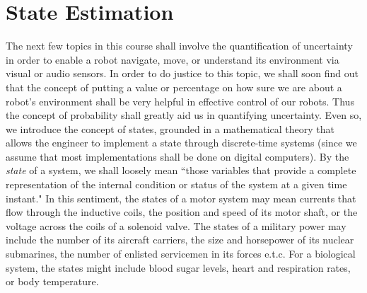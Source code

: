\chapter{State Estimation}
\label{chap:state_ext}

The next few topics in this course shall involve the quantification of uncertainty in order to enable a robot navigate, move, or understand its environment via visual or audio sensors. In order to do justice to this topic, we shall soon find out that the concept of putting a value or percentage on how sure we are about a robot's environment shall be very helpful in effective control of our robots. Thus the concept of probability shall greatly aid us in quantifying uncertainty. Even so, we introduce the concept of states, grounded in a mathematical theory that allows the engineer to implement a state through discrete-time systems (since we assume that most implementations shall be done on digital computers). By the \textit{state} of a system, we shall loosely mean ``those variables that provide a complete representation of the internal condition or status of the system at a given time instant." In this sentiment, the states of a motor system may mean currents that flow through the inductive coils, the position and speed of its motor shaft, or the voltage across the coils of a solenoid valve. The states of a military power may include the number of its aircraft carriers, the size and horsepower of its nuclear submarines, the number of enlisted servicemen in its forces e.t.c. For a biological system, the states might include blood sugar levels, heart and respiration rates, or body temperature.


